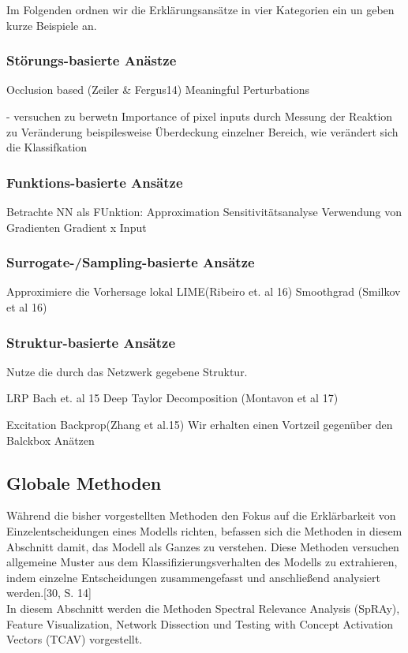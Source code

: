 \documentclass[11pt,a4paper]{article}
\numberwithin{equation}{section}
\begin{document}
	
	Im Folgenden ordnen wir die Erklärungsansätze in vier Kategorien ein un geben kurze Beispiele an.
	
	\subsubsection{Störungs-basierte Anästze}
	Occlusion based (Zeiler \& Fergus14)
	Meaningful Perturbations
	
	- versuchen zu berwetn Importance of pixel inputs durch Messung der Reaktion zu Veränderung beispilesweise Überdeckung einzelner Bereich, wie verändert sich die Klassifkation
	\subsubsection{Funktions-basierte Ansätze}
	Betrachte NN als FUnktion: Approximation Sensitivitätsanalyse Verwendung von Gradienten
	Gradient x Input
	
	
	\subsubsection{Surrogate-/Sampling-basierte Ansätze}
	
	Approximiere die Vorhersage lokal
	LIME(Ribeiro et. al 16)
	Smoothgrad (Smilkov et al 16)
	
	\subsubsection{Struktur-basierte Ansätze}
	Nutze die durch das Netzwerk gegebene Struktur.
	
	LRP Bach et. al 15
	Deep Taylor Decomposition (Montavon et al 17)
	
	Excitation Backprop(Zhang et al.15)
	Wir erhalten einen Vortzeil gegenüber den Balckbox Anätzen
	
	
	\subsection{Globale Methoden}
	
	Während die bisher vorgestellten Methoden den Fokus auf die Erklärbarkeit von Einzelentscheidungen eines Modells richten, befassen sich die Methoden in diesem
	Abschnitt damit, das Modell als Ganzes zu verstehen. Diese Methoden versuchen allgemeine
	Muster aus dem Klassifizierungsverhalten des Modells zu extrahieren, indem einzelne Entscheidungen zusammengefasst und anschließend analysiert werden.[30, S. 14]\\
	In diesem Abschnitt werden die Methoden Spectral Relevance Analysis (SpRAy),
	Feature Visualization, Network Dissection und Testing with Concept Activation
	Vectors (TCAV) vorgestellt.\\
	
\end{document}
